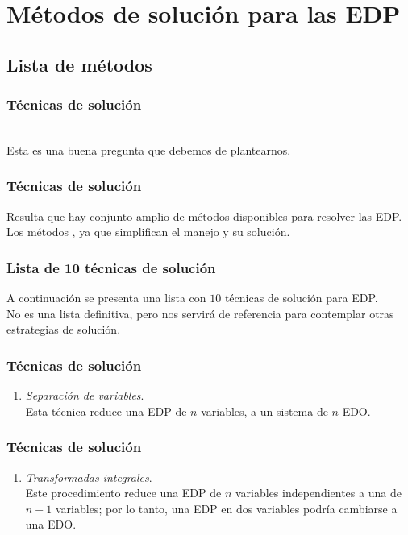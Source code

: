 \documentclass[12pt]{beamer}
\begin{document}
\section{Métodos de solución para las EDP}
\subsection{Lista de métodos}

\begin{frame}
\frametitle{Técnicas de solución}
\\
\bigskip
\pause
Esta es una buena pregunta que debemos de plantearnos.
\end{frame}
\begin{frame}
\frametitle{Técnicas de solución}
Resulta que hay conjunto amplio de métodos disponibles para resolver las EDP.
\\
\bigskip
\pause
Los métodos , ya que simplifican el manejo y su solución.
\end{frame}
\begin{frame}
\frametitle{Lista de 10 técnicas de solución}
A continuación se presenta una lista con $10$ técnicas de solución para EDP.
\\
\bigskip
\pause
No es una lista definitiva, pero nos servirá de referencia para contemplar otras estrategias de solución.
\end{frame}
\begin{frame}
\frametitle{Técnicas de solución}
\begin{enumerate}
\item \emph{Separación de variables}.
\\
\bigskip
Esta técnica reduce una EDP de $n$ variables, a un sistema de $n$ EDO.
\seti
\end{enumerate}
\end{frame}
\begin{frame}
\frametitle{Técnicas de solución}
\begin{enumerate}
\conti
\item \emph{Transformadas integrales}. 
\\
\bigskip
Este procedimiento reduce una EDP de $n$ variables independientes a una de $n - 1$ variables; por lo tanto, una EDP en dos variables podría cambiarse a una EDO.
\seti
\end{enumerate}
\end{frame}
\end{document}

